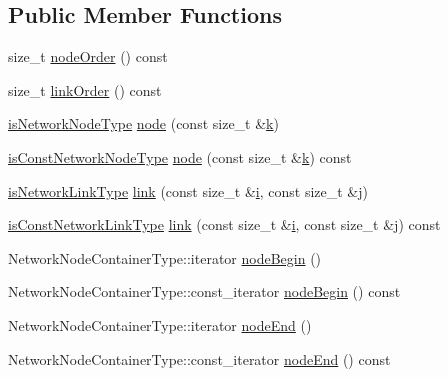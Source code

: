 \subsection*{Public Member Functions}
\begin{DoxyCompactItemize}
\item 
size\+\_\+t \hyperlink{classmodel_1_1_network_a970db0922c8516c63d198de1769f087e}{node\+Order} () const 
\item 
size\+\_\+t \hyperlink{classmodel_1_1_network_a07712cf643adabc04a781f2ecf2da360}{link\+Order} () const 
\item 
\hyperlink{_network_typedefs_8h_a848fa987d3bfa490dafc75045cac55b4}{is\+Network\+Node\+Type} \hyperlink{classmodel_1_1_network_a2ca81a76b9ae37584f01f8dac04b2339}{node} (const size\+\_\+t \&\hyperlink{_f_e_m_2linear__elasticity__3d_2tetgen_2generate_p_o_l_ycube_8m_a5d2aad4440da75aa43f2643e72b1a3bd}{k})
\item 
\hyperlink{_network_typedefs_8h_ab42a099dc90a5f2f5b1fd93f8d11ce30}{is\+Const\+Network\+Node\+Type} \hyperlink{classmodel_1_1_network_ab254032a63da8246a8f095bf337d3cda}{node} (const size\+\_\+t \&\hyperlink{_f_e_m_2linear__elasticity__3d_2tetgen_2generate_p_o_l_ycube_8m_a5d2aad4440da75aa43f2643e72b1a3bd}{k}) const 
\item 
\hyperlink{_network_typedefs_8h_a08032ab00b715014cdc1d56544b8a855}{is\+Network\+Link\+Type} \hyperlink{classmodel_1_1_network_a23d0096113a838598458eadc45f62ee8}{link} (const size\+\_\+t \&\hyperlink{_cubic_spline_intersection_8m_a6f6ccfcf58b31cb6412107d9d5281426}{i}, const size\+\_\+t \&j)
\item 
\hyperlink{_network_typedefs_8h_a28fb3dd37a7a0c539a9990c7fe363458}{is\+Const\+Network\+Link\+Type} \hyperlink{classmodel_1_1_network_a811776fbc5acfd5f0651be9077b05921}{link} (const size\+\_\+t \&\hyperlink{_cubic_spline_intersection_8m_a6f6ccfcf58b31cb6412107d9d5281426}{i}, const size\+\_\+t \&j) const 
\item 
Network\+Node\+Container\+Type\+::iterator \hyperlink{classmodel_1_1_network_a2a0ed050e765caf19aa335536cef0f24}{node\+Begin} ()
\item 
Network\+Node\+Container\+Type\+::const\+\_\+iterator \hyperlink{classmodel_1_1_network_ac14741bfe29a8841962d36b685e6b775}{node\+Begin} () const 
\item 
Network\+Node\+Container\+Type\+::iterator \hyperlink{classmodel_1_1_network_a2b1793323edd63963c6aec3caeb9aef6}{node\+End} ()
\item 
Network\+Node\+Container\+Type\+::const\+\_\+iterator \hyperlink{classmodel_1_1_network_a059251de969710736fd091fd5adad022}{node\+End} () const 

\end{DoxyCompactItemize}

